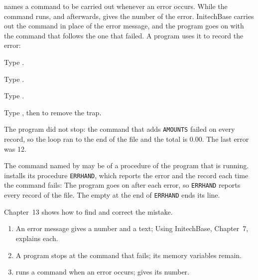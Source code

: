  names a command to be carried out whenever an error occurs.  While
the command runs, and afterwards,  gives the number of the error.
InitechBase carries out the command in place of the error message, and the
program goes on with the command that follows the one that failed.  A program
uses it to record the error:
\begin{Steps}
\item Type .
\item Type .
\item Type .
\item Type , then  to remove the trap.
\end{Steps}
The program did not stop: the command that adds \texttt{AMOUNTS} failed on every
record, so the loop ran to the end of the file and the total is 0.00.  The
last error was 12.

The command named by  may be  of a procedure of the program
that is running.   installs its procedure \texttt{ERRHAND},
which reports the error and the record each time the command fails:
The program goes on after each error, so \texttt{ERRHAND} reports every record
of the file.  The empty  at the end of \texttt{ERRHAND} ends its line.

Chapter~13 shows how to find and correct the mistake.

\begin{enumerate}
\item An error message gives a number and a text; Using InitechBase, Chapter~7,
  explains each.
\item A program stops at the command that fails; its memory variables remain.
\item {}  runs a command when an error occurs;
   gives its number.
\end{enumerate}
